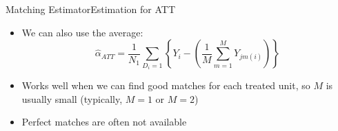 \documentclass[hyperref={pdfpagelabels=false}]{beamer}
\begin{document}
\begin{frame}{Matching Estimator}{Estimation for ATT}
\begin{itemize}
	

	
\item We can also use the average:
	\begin{equation*}
	\hat{\alpha}_{\text{}ATT}=\dfrac{1}{N_1}\sum_{D_i=1}\left\lbrace Y_i-\left(\dfrac{1}{M}\sum^M_{m=1}Y_{jm(i)}\right)\right\rbrace
	\end{equation*}
\item Works well when we can find good matches for each treated unit, so $M$ is usually small (typically, $M=1$ or $M=2$)
\vspace{0.3cm}
		\item Perfect matches are often not available 

\end{itemize}
\end{frame}
\end{document}
